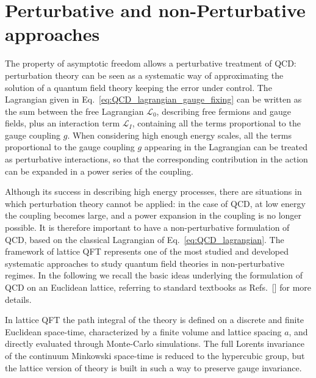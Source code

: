 \section{Perturbative and non-Perturbative approaches}
The property of asymptotic freedom allows a perturbative treatment of QCD: 
perturbation theory can be seen as a systematic way of approximating the solution 
of a quantum field theory keeping the error under control.
The Lagrangian given in Eq.~\ref{eq:QCD_lagrangian_gauge_fixing}
can be written as the sum between the free Lagrangian $\mathcal{L}_0$, describing free fermions and gauge fields, 
plus an interaction term $\mathcal{L}_I$, containing all the terms proportional to the gauge coupling $g$.
When considering high enough energy scales, all the terms proportional to the gauge coupling $g$
appearing in the Lagrangian can be treated as perturbative interactions, so that the corresponding
contribution in the action can be expanded in a power series of the coupling.
   
%
Although its success in describing high energy processes, there are situations
in which perturbation theory cannot be applied: in the case of QCD, at low energy the coupling
becomes large, and a power expansion in the coupling is no longer possible. 
It is therefore important to have a non-perturbative formulation of QCD, based on the classical Lagrangian 
of Eq.~\ref{eq:QCD_lagrangian}.
The framework of lattice QFT represents one of the most studied and developed systematic approaches to study quantum
field theories in non-perturbative regimes. In the following we recall the basic ideas underlying the formulation of 
QCD on an Euclidean lattice, referring to standard textbooks as Refs.~[] for more details.

%
In lattice QFT the path integral of the theory is defined on a discrete and finite Euclidean space-time,
characterized by a finite volume and lattice spacing $a$, and directly evaluated through Monte-Carlo simulations.
The full Lorents invariance of the continuum Minkowski space-time is reduced to the hypercubic group, 
but the lattice version of theory is built in such a way to preserve gauge invariance.

